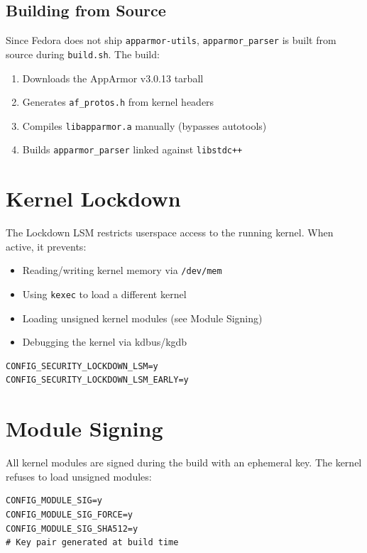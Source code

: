 \subsection{Building from Source}

Since Fedora does not ship \texttt{apparmor-utils}, \texttt{apparmor\_parser}
is built from source during \texttt{build.sh}. The build:

\begin{enumerate}[nosep]
  \item Downloads the AppArmor v3.0.13 tarball
  \item Generates \texttt{af\_protos.h} from kernel headers
  \item Compiles \texttt{libapparmor.a} manually (bypasses autotools)
  \item Builds \texttt{apparmor\_parser} linked against \texttt{libstdc++}
\end{enumerate}

\section{Kernel Lockdown}

The Lockdown LSM restricts userspace access to the running kernel.
When active, it prevents:

\begin{itemize}[nosep]
  \item Reading/writing kernel memory via \texttt{/dev/mem}
  \item Using \texttt{kexec} to load a different kernel
  \item Loading unsigned kernel modules (see Module Signing)
  \item Debugging the kernel via kdbus/kgdb
\end{itemize}

\begin{lstlisting}
CONFIG_SECURITY_LOCKDOWN_LSM=y
CONFIG_SECURITY_LOCKDOWN_LSM_EARLY=y
\end{lstlisting}

\section{Module Signing}

All kernel modules are signed during the build with an ephemeral
key. The kernel refuses to load unsigned modules:

\begin{lstlisting}
CONFIG_MODULE_SIG=y
CONFIG_MODULE_SIG_FORCE=y
CONFIG_MODULE_SIG_SHA512=y
# Key pair generated at build time
\end{lstlisting}


